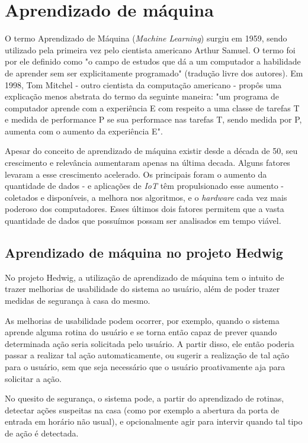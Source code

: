 \chapter{Aprendizado de máquina}

	O termo Aprendizado de Máquina (\emph{Machine Learning}) surgiu em 1959, sendo utilizado pela primeira vez  pelo cientista americano Arthur Samuel. O termo foi por ele definido como "o campo de estudos que dá a um computador a habilidade de aprender sem ser explicitamente programado" (tradução livre dos autores). Em 1998, Tom Mitchel - outro cientista da computação americano - propôs uma explicação menos abstrata do termo da seguinte maneira: "um programa de computador aprende com a experiência E com respeito a uma classe de tarefas T e medida de performance P se sua performace nas tarefas T, sendo medida por P, aumenta com o aumento da experiência E".

	Apesar do conceito de aprendizado de máquina existir desde a década de 50, seu crescimento e relevância aumentaram apenas na última decada. Alguns fatores levaram a esse crescimento acelerado. Os principais foram o aumento da quantidade de dados - e aplicações de \emph{IoT} têm propulsionado esse aumento - coletados e disponíveis, a melhora nos algoritmos, e o \emph{hardware} cada vez mais poderoso dos computadores. Esses últimos dois fatores permitem que a vasta quantidade de dados que possuímos possam ser analisados em tempo viável.

	\section{Aprendizado de máquina no projeto Hedwig}

		No projeto Hedwig, a utilização de aprendizado de máquina tem o intuito de trazer melhorias de usabilidade do sistema ao usuário, além de poder trazer medidas de segurança à casa do mesmo.

		As melhorias de usabilidade podem ocorrer, por exemplo, quando o sistema aprende alguma rotina do usuário e se torna então capaz de prever quando determinada ação seria solicitada pelo usuário. A partir disso, ele então poderia passar a realizar tal ação automaticamente, ou sugerir a realização de tal ação para o usuário, sem que seja necessário que o usuário proativamente aja para solicitar a ação.

		No quesito de segurança, o sistema pode, a partir do aprendizado de rotinas, detectar ações suspeitas na casa (como por exemplo a abertura da porta de entrada em horário não usual), e opcionalmente agir para intervir quando tal tipo de ação é detectada.

